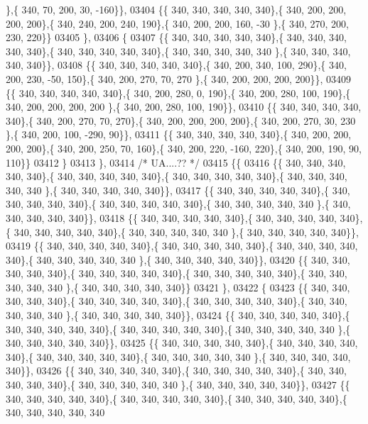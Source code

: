 \begin{DoxyCode}
      \},\{ 340,  70, 200,  30, -160\}\},
03404 \{\{ 340, 340, 340, 340, 340\},\{ 340, 200, 200, 200, 200\},\{ 340, 240, 200, 240, 190\},\{ 340, 200, 200, 160, -30
      \},\{ 340, 270, 200, 230, 220\}\}
03405 \},
03406 \{
03407 \{\{ 340, 340, 340, 340, 340\},\{ 340, 340, 340, 340, 340\},\{ 340, 340, 340, 340, 340\},\{ 340, 340, 340, 340, 340
      \},\{ 340, 340, 340, 340, 340\}\},
03408 \{\{ 340, 340, 340, 340, 340\},\{ 340, 200, 340, 100, 290\},\{ 340, 200, 230, -50, 150\},\{ 340, 200, 270,  70, 270
      \},\{ 340, 200, 200, 200, 200\}\},
03409 \{\{ 340, 340, 340, 340, 340\},\{ 340, 200, 280,   0, 190\},\{ 340, 200, 280, 100, 190\},\{ 340, 200, 200, 200, 200
      \},\{ 340, 200, 280, 100, 190\}\},
03410 \{\{ 340, 340, 340, 340, 340\},\{ 340, 200, 270,  70, 270\},\{ 340, 200, 200, 200, 200\},\{ 340, 200, 270,  30, 230
      \},\{ 340, 200, 100, -290,  90\}\},
03411 \{\{ 340, 340, 340, 340, 340\},\{ 340, 200, 200, 200, 200\},\{ 340, 200, 250,  70, 160\},\{ 340, 200, 220, -160, 
      220\},\{ 340, 200, 190,  90, 110\}\}
03412 \}
03413 \},
03414 \textcolor{comment}{/* UA....?? */}
03415 \{\{
03416 \{\{ 340, 340, 340, 340, 340\},\{ 340, 340, 340, 340, 340\},\{ 340, 340, 340, 340, 340\},\{ 340, 340, 340, 340, 340
      \},\{ 340, 340, 340, 340, 340\}\},
03417 \{\{ 340, 340, 340, 340, 340\},\{ 340, 340, 340, 340, 340\},\{ 340, 340, 340, 340, 340\},\{ 340, 340, 340, 340, 340
      \},\{ 340, 340, 340, 340, 340\}\},
03418 \{\{ 340, 340, 340, 340, 340\},\{ 340, 340, 340, 340, 340\},\{ 340, 340, 340, 340, 340\},\{ 340, 340, 340, 340, 340
      \},\{ 340, 340, 340, 340, 340\}\},
03419 \{\{ 340, 340, 340, 340, 340\},\{ 340, 340, 340, 340, 340\},\{ 340, 340, 340, 340, 340\},\{ 340, 340, 340, 340, 340
      \},\{ 340, 340, 340, 340, 340\}\},
03420 \{\{ 340, 340, 340, 340, 340\},\{ 340, 340, 340, 340, 340\},\{ 340, 340, 340, 340, 340\},\{ 340, 340, 340, 340, 340
      \},\{ 340, 340, 340, 340, 340\}\}
03421 \},
03422 \{
03423 \{\{ 340, 340, 340, 340, 340\},\{ 340, 340, 340, 340, 340\},\{ 340, 340, 340, 340, 340\},\{ 340, 340, 340, 340, 340
      \},\{ 340, 340, 340, 340, 340\}\},
03424 \{\{ 340, 340, 340, 340, 340\},\{ 340, 340, 340, 340, 340\},\{ 340, 340, 340, 340, 340\},\{ 340, 340, 340, 340, 340
      \},\{ 340, 340, 340, 340, 340\}\},
03425 \{\{ 340, 340, 340, 340, 340\},\{ 340, 340, 340, 340, 340\},\{ 340, 340, 340, 340, 340\},\{ 340, 340, 340, 340, 340
      \},\{ 340, 340, 340, 340, 340\}\},
03426 \{\{ 340, 340, 340, 340, 340\},\{ 340, 340, 340, 340, 340\},\{ 340, 340, 340, 340, 340\},\{ 340, 340, 340, 340, 340
      \},\{ 340, 340, 340, 340, 340\}\},
03427 \{\{ 340, 340, 340, 340, 340\},\{ 340, 340, 340, 340, 340\},\{ 340, 340, 340, 340, 340\},\{ 340, 340, 340, 340, 340

\end{DoxyCode}
